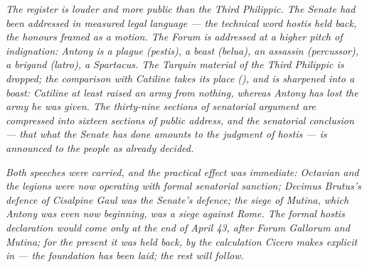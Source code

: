 \textit{The register is louder and more public than the Third
Philippic. The Senate had been addressed in measured legal
language --- the technical word \textit{hostis} held back, the
honours framed as a motion. The Forum is addressed at a higher
pitch of indignation: Antony is a plague (\textit{pestis}), a
beast (\textit{belua}), an assassin (\textit{percussor}), a
brigand (\textit{latro}), a Spartacus. The Tarquin material of
the Third Philippic is dropped; the comparison with Catiline
takes its place (), and is sharpened into a
boast: Catiline at least raised an army from nothing, whereas
Antony has lost the army he was given. The thirty-nine
sections of senatorial argument are compressed into sixteen
sections of public address, and the senatorial conclusion ---
that what the Senate has done amounts to the judgment of
\textit{hostis} --- is announced to the people as already
decided.}

\textit{Both speeches were carried, and the practical effect
was immediate: Octavian and the legions were now operating with
formal senatorial sanction; Decimus Brutus's defence of Cisalpine
Gaul was the Senate's defence; the siege of Mutina, which Antony
was even now beginning, was a siege against Rome. The formal
\textit{hostis} declaration would come only at the end of April
43, after Forum Gallorum and Mutina; for the present it was
held back, by the calculation Cicero makes explicit in
 --- the foundation has been laid; the rest will
follow.}
